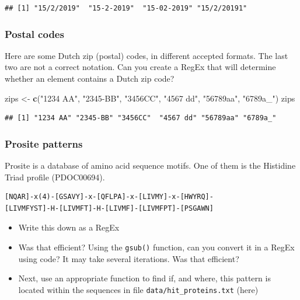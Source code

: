 \documentclass[]{book}
\newenvironment{Shaded}{\begin{snugshade}}{\end{snugshade}}
\newcommand{\KeywordTok}[1]{\textcolor[rgb]{0.13,0.29,0.53}{\textbf{#1}}}
\newcommand{\NormalTok}[1]{#1}
\newcommand{\StringTok}[1]{\textcolor[rgb]{0.31,0.60,0.02}{#1}}
\providecommand{\tightlist}{%
  \setlength{\itemsep}{0pt}\setlength{\parskip}{0pt}}
\begin{document}
\begin{verbatim}
## [1] "15/2/2019"  "15-2-2019"  "15-02-2019" "15/2/20191"
\end{verbatim}

\hypertarget{postal-codes}{%
\subsubsection*{Postal codes}\label{postal-codes}}

Here are some Dutch zip (postal) codes, in different accepted formats. The last two are not a correct notation.
Can you create a RegEx that will determine whether an element contains a Dutch zip code?

\begin{Shaded}
\begin{Highlighting}[]
\NormalTok{zips <-}\StringTok{ }\KeywordTok{c}\NormalTok{(}\StringTok{"1234 AA"}\NormalTok{, }\StringTok{"2345-BB"}\NormalTok{, }\StringTok{"3456CC"}\NormalTok{, }\StringTok{"4567 dd"}\NormalTok{, }\StringTok{"56789aa"}\NormalTok{, }\StringTok{"6789a_"}\NormalTok{)}
\NormalTok{zips}
\end{Highlighting}
\end{Shaded}

\begin{verbatim}
## [1] "1234 AA" "2345-BB" "3456CC"  "4567 dd" "56789aa" "6789a_"
\end{verbatim}

\hypertarget{prosite-patterns}{%
\subsubsection*{Prosite patterns}\label{prosite-patterns}}

Prosite is a database of amino acid sequence motifs. One of them is the Histidine Triad profile (PDOC00694).

\begin{verbatim}
[NQAR]-x(4)-[GSAVY]-x-[QFLPA]-x-[LIVMY]-x-[HWYRQ]-  
[LIVMFYST]-H-[LIVMFT]-H-[LIVMF]-[LIVMFPT]-[PSGAWN]
\end{verbatim}

\begin{itemize}
\tightlist
\item
  Write this down as a RegEx
\item
  Was that efficient? Using the \texttt{gsub()} function, can you convert it in a RegEx using code? It may take several iterations. Was that efficient?\\
\item
  Next, use an appropriate function to find if, and where, this pattern is located within the sequences in file \texttt{data/hit\_proteins.txt} (here)
\end{itemize}
\end{document}
